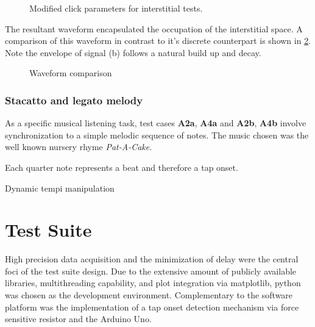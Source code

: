 \begin{figure}[H]
    \centering
    \caption{Modified click parameters for interstitial tests.}
        \qquad
        \qquad
    \label{fig:modClick}
\end{figure}

The resultant waveform encapsulated the occupation of the interstitial space. A comparison of this waveform in contrast to it's discrete counterpart is shown in \ref{fig:click_comparison}. Note the envelope of signal (b) follows a natural build up and decay.

\begin{figure}[H]
    \centering
    \caption{Waveform comparison}
    \label{fig:click_comparison}
\end{figure}

\subsubsection{Stacatto and legato melody}
As a specific musical listening task, test cases \textbf{A2a}, \textbf{A4a} and \textbf{A2b}, \textbf{A4b} involve synchronization to a simple melodic sequence of notes. The music chosen was the well known nursery rhyme \textit{Pat-A-Cake}. 

Each quarter note represents a beat and therefore a tap onset.


Dynamic tempi manipulation


\pagebreak

\section{Test Suite}
High precision data acquisition and the minimization of delay were the central foci of the test suite design. Due to the extensive amount of publicly available libraries, multithreading capability, and plot integration via matplotlib, python was chosen as the development environment. Complementary to the software platform was the implementation of a tap onset detection mechanism via force sensitive resistor and the Arduino Uno. 

